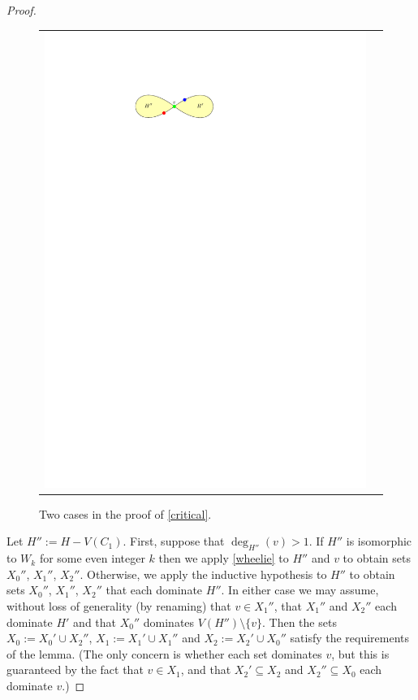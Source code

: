 \documentclass[12pt]{article}
\theoremstyle{definition}
\begin{document}
\begin{proof}
\begin{figure}[htbp]
\begin{tabular}{cc}
      \includegraphics[page=2]{figs/critical_3_colouring}
    \end{tabular}
    \caption{Two cases in the proof of \cref{critical}.}
    \label{critical_3_colouring}
  \end{figure}

  Let $H'':=H-V(C_1)$. First, suppose that $\deg_{H''}(v)>1$.
  If $H''$ is isomorphic to $W_k$ for some even integer $k$ then we apply \cref{wheelie} to $H''$ and $v$ to obtain sets $X_0''$, $X_1''$, $X_2''$. Otherwise, we apply the inductive hypothesis to $H''$ to obtain sets $X_0''$, $X_1''$, $X_2''$ that each dominate $H''$. In either case we may assume, without loss of generality (by renaming) that $v\in X_1''$, that $X_1''$ and $X_2''$ each dominate $H'$ and that $X_0''$ dominates $V(H'')\setminus\{v\}$.  Then the sets $X_0:=X_0'\cup X_2''$, $X_1:=X_1'\cup X_1''$ and $X_2:=X_2'\cup X_0''$ satisfy the requirements of the lemma.  (The only concern is whether each set dominates $v$, but this is guaranteed by the fact that $v\in X_1$, and that $X_2'\subseteq X_2$ and $X_2''\subseteq X_0$ each dominate $v$.)


\end{proof}
\end{document}
